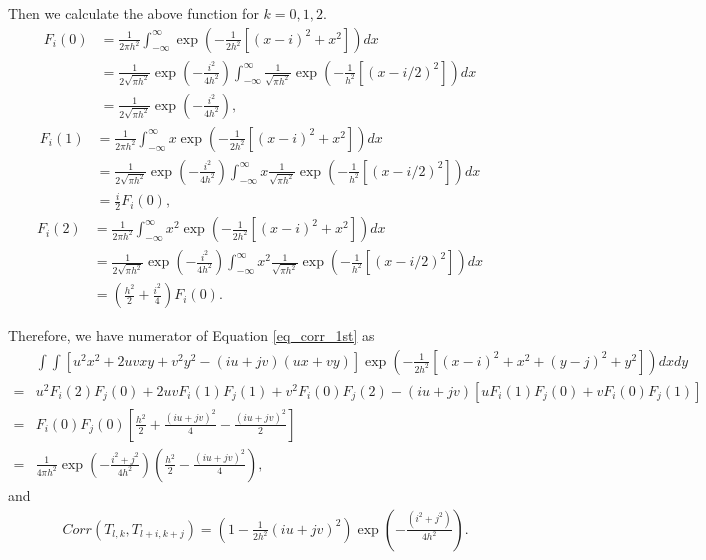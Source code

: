 \documentclass{article}
\begin{document}
\begin{appendices}
	Then we calculate the above function for $k=0,1,2$.
	\begin{equation*}
		\begin{aligned}
			F_{i}(0)&=\frac{1}{2\pi h^2}\int_{-\infty}^{\infty}\exp(-\frac{1}{2h^2}[(x-i)^2+x^2])dx\\
			&=\frac{1}{2\sqrt{\pi h^2}}\exp(-\frac{i^2}{4h^2})\int_{-\infty}^{\infty}\frac{1}{\sqrt{\pi h^2}}\exp(-\frac{1}{h^2}[(x-i/2)^2])dx\\
			&=\frac{1}{2\sqrt{\pi h^2}}\exp(-\frac{i^2}{4h^2}),
		\end{aligned}
	\end{equation*}
	\begin{equation*}
		\begin{aligned}
			F_{i}(1)&=\frac{1}{2\pi h^2}\int_{-\infty}^{\infty}x\exp(-\frac{1}{2h^2}[(x-i)^2+x^2])dx\\
			&=\frac{1}{2\sqrt{\pi h^2}}\exp(-\frac{i^2}{4h^2})\int_{-\infty}^{\infty}x\frac{1}{\sqrt{\pi h^2}}\exp(-\frac{1}{h^2}[(x-i/2)^2])dx\\
			&=\frac{i}{2}F_{i}(0),
		\end{aligned}
	\end{equation*}
	\begin{equation*}
		\begin{aligned}
			F_{i}(2)&=\frac{1}{2\pi h^2}\int_{-\infty}^{\infty}x^2\exp(-\frac{1}{2h^2}[(x-i)^2+x^2])dx\\
			&=\frac{1}{2\sqrt{\pi h^2}}\exp(-\frac{i^2}{4h^2})\int_{-\infty}^{\infty}x^2\frac{1}{\sqrt{\pi h^2}}\exp(-\frac{1}{h^2}[(x-i/2)^2])dx\\
			&=(\frac{h^2}{2}+\frac{i^2}{4})F_{i}(0).
		\end{aligned}
	\end{equation*}
	
	Therefore, we have numerator of Equation \eqref{eq_corr_1st} as
	\begin{equation*}
		\begin{aligned}
			&\int\int[u^2x^2+2uvxy+v^2y^2-(iu+jv)(ux+vy)]\exp(-\frac{1}{2h^2}[(x-i)^2+x^2+(y-j)^2+y^2])dxdy\\
			=&u^2F_{i}(2)F_{j}(0)+2uvF_{i}(1)F_{j}(1)+v^2F_{i}(0)F_{j}(2)-(iu+jv)[uF_{i}(1)F_{j}(0)+vF_{i}(0)F_{j}(1)]\\
			=&F_{i}(0)F_{j}(0)[\frac{h^2}{2}+\frac{(iu+jv)^2}{4}-\frac{(iu+jv)^2}{2}]\\
			=&\frac{1}{4\pi h^2}\exp(-\frac{i^2+j^2}{4h^2})(\frac{h^2}{2}-\frac{(iu+jv)^2}{4}),
		\end{aligned}
	\end{equation*}
	and 
	\begin{equation*}
		\begin{aligned}
			&Corr(T_{l,k},T_{l+i,k+j})=(1-\frac{1}{2h^2}(iu+jv)^2)\exp(-\frac{(i^2+j^2)}{4h^2}).
		\end{aligned}
	\end{equation*}

\end{appendices}
\end{document}
